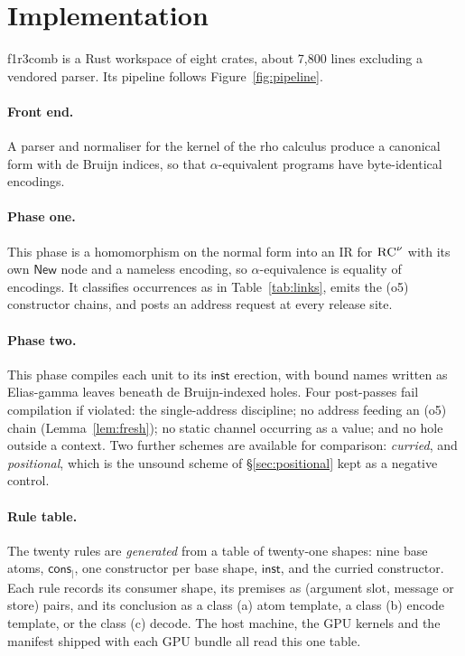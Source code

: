 \documentclass[acmsmall,screen,review,anonymous]{acmart}
\newcommand{\cons}{\mathsf{cons}}
\newcommand{\inst}{\mathsf{inst}}
\newcommand{\tool}{\textsf{f1r3comb}}
\newcommand{\rcnu}{\textsc{RC}^{\nu}}
\begin{document}
\section{Implementation}
\label{sec:impl}

\tool{} is a Rust workspace of eight crates, about 7{,}800 lines excluding a
vendored parser. Its pipeline follows Figure~\ref{fig:pipeline}.

\paragraph{Front end.} A parser and normaliser for the kernel of the rho
calculus produce a canonical form with de Bruijn indices, so that
$\alpha$-equivalent programs have byte-identical encodings.

\paragraph{Phase one.} This phase is a homomorphism on the normal form into an IR for
$\rcnu$ with its own $\mathsf{New}$ node and a nameless encoding, so
$\alpha$-equivalence is equality of encodings. It classifies occurrences as in
Table~\ref{tab:links}, emits the (o5) constructor chains, and posts an address
request at every release site.

\paragraph{Phase two.} This phase compiles each unit to its $\inst$ erection, with bound
names written as Elias-gamma leaves beneath de Bruijn-indexed holes. Four
post-passes fail compilation if violated: the single-address discipline; no
address feeding an (o5) chain (Lemma~\ref{lem:fresh}); no static channel
occurring as a value; and no hole outside a context. Two further schemes are
available for comparison: \emph{curried}, and \emph{positional}, which is the
unsound scheme of \S\ref{sec:positional} kept as a negative control.

\paragraph{Rule table.} The twenty rules are \emph{generated} from a table of
twenty-one shapes: nine base atoms, $\cons_{\mid}$, one constructor per base
shape, $\inst$, and the curried constructor. Each rule records its consumer
shape, its premises as (argument slot, message or store) pairs, and its
conclusion as a class (a) atom template, a class (b) encode template, or the
class (c) decode. The host machine, the GPU kernels and the manifest shipped
with each GPU bundle all read this one table.
\end{document}
